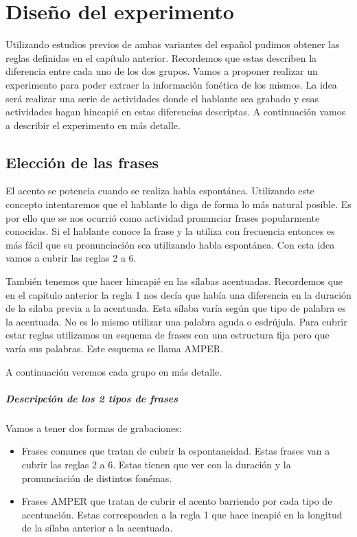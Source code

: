 \chapter{Diseño del experimento}

Utilizando estudios previos de ambas variantes del español pudimos obtener las reglas definidas en el capítulo anterior. Recordemos que estas describen la diferencia entre cada uno de los dos grupos. Vamos a proponer realizar un experimento para poder extraer la información fonética de los mismos. La idea será realizar una serie de actividades donde el hablante sea grabado y esas actividades hagan hincapié en estas diferencias descriptas. A continuación vamos a describir el experimento en más detalle.

\section{Elección de las frases}

El acento se potencia cuando se realiza habla espontánea. Utilizando este concepto intentaremos que el hablante lo diga de forma lo más natural posible. Es por ello que se nos ocurrió como actividad pronunciar frases popularmente conocidas. Si el hablante conoce la frase y la utiliza con frecuencia entonces es más fácil que su pronunciación sea utilizando habla espontánea. Con esta idea vamos a cubrir las reglas 2 a 6.

También tenemos que hacer hincapié en las sílabas acentuadas. Recordemos que en el capítulo anterior la regla 1 nos decía que había una diferencia en la duración de la silaba previa a la acentuada. Esta sílaba varía según que tipo de palabra es la acentuada. No es lo mismo utilizar una palabra aguda o esdrújula. Para cubrir estar reglas utilizamos un esquema de frases con una estructura fija pero que varía sus palabras. Este esquema se llama AMPER.

A continuación veremos cada grupo en más detalle. 

\paragraph{Descripción de los 2 tipos de frases}

Vamos a tener dos formas de grabaciones: 

\begin{itemize}
  \item Frases comunes que tratan de cubrir la espontaneidad. Estas frases van a cubrir las reglas 2 a 6. Estas tienen que ver con la duración y la pronunciación de distintos fonémas.  
  \item Frases AMPER que tratan de cubrir el acento barriendo por cada tipo de acentuación. Estas corresponden a la regla 1 que hace incapié en la longitud de la sílaba anterior a la acentuada.
\end{itemize}

